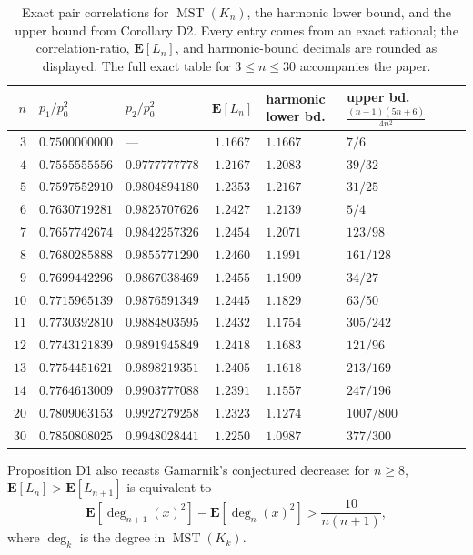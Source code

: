 \documentclass[10pt,a4paper]{amsart}
\newcommand{\MST}{\operatorname{MST}}
\newcommand{\E}{\mathbf{E}}
\DeclareMathOperator{\dg}{deg}
\begin{document}
\begin{table}[t]
\centering
\begin{tabular}{rllcll}
\toprule
$n$ & $p_1/p_0^2$ & $p_2/p_0^2$ & $\E[L_n]$ & harmonic lower bd.
& upper bd.\ $\frac{(n-1)(5n+6)}{4n^2}$\\
\midrule
$3$  & $0.7500000000$ & ---            & $1.1667$ & $1.1667$ & $7/6$\\
$4$  & $0.7555555556$ & $0.9777777778$ & $1.2167$ & $1.2083$ & $39/32$\\
$5$  & $0.7597552910$ & $0.9804894180$ & $1.2353$ & $1.2167$ & $31/25$\\
$6$  & $0.7630719281$ & $0.9825707626$ & $1.2427$ & $1.2139$ & $5/4$\\
$7$  & $0.7657742674$ & $0.9842257326$ & $1.2454$ & $1.2071$ & $123/98$\\
$8$  & $0.7680285888$ & $0.9855771290$ & $1.2460$ & $1.1991$ & $161/128$\\
$9$  & $0.7699442296$ & $0.9867038469$ & $1.2455$ & $1.1909$ & $34/27$\\
$10$ & $0.7715965139$ & $0.9876591349$ & $1.2445$ & $1.1829$ & $63/50$\\
$11$ & $0.7730392810$ & $0.9884803595$ & $1.2432$ & $1.1754$ & $305/242$\\
$12$ & $0.7743121839$ & $0.9891945849$ & $1.2418$ & $1.1683$ & $121/96$\\
$13$ & $0.7754451621$ & $0.9898219351$ & $1.2405$ & $1.1618$ & $213/169$\\
$14$ & $0.7764613009$ & $0.9903777088$ & $1.2391$ & $1.1557$ & $247/196$\\
$20$ & $0.7809063153$ & $0.9927279258$ & $1.2323$ & $1.1274$ & $1007/800$\\
$30$ & $0.7850808025$ & $0.9948028441$ & $1.2250$ & $1.0987$ & $377/300$\\
\bottomrule
\end{tabular}
\caption{Exact pair correlations for $\MST(K_n)$, the harmonic lower bound,
and the upper bound from Corollary D2. Every entry comes from an exact rational;
the correlation-ratio, $\E[L_n]$, and harmonic-bound decimals are rounded as
displayed. The full exact table for $3\le n\le30$ accompanies the paper.}
\label{tab:exact}
\end{table}

Proposition D1 also recasts Gamarnik's conjectured decrease: for $n\ge8$,
$\E[L_n]>\E[L_{n+1}]$ is equivalent to
\[
\E[\dg_{n+1}(x)^2]-\E[\dg_n(x)^2]>\frac{10}{n(n+1)},
\]
where $\dg_k$ is the degree in $\MST(K_k)$.
\end{document}
